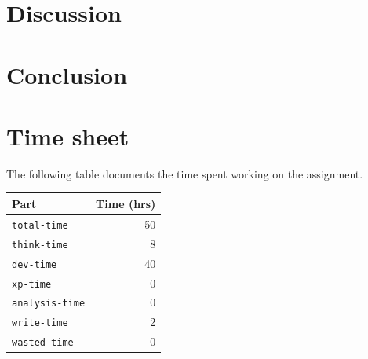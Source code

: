 \documentclass{acm_proc_article-sp}
\begin{document}
\section{Discussion}
\label{sec_discussion}

\section{Conclusion}
\label{sec_conclusion}

{}


\appendix
\section{Time sheet}

The following table documents the time spent working on the assignment.

\begin{tabular}{ | l | r | }
	\hline
	Part & Time (hrs) \\ \hline \hline
	\texttt{total-time} & 50\\ \hline
	\texttt{think-time} & 8\\ \hline
	\texttt{dev-time} & 40\\ \hline
	\texttt{xp-time} & 0\\ \hline
	\texttt{analysis-time} & 0\\ \hline
	\texttt{write-time} & 2\\ \hline
	\texttt{wasted-time} & 0\\ \hline
\end{tabular}
\end{document}
